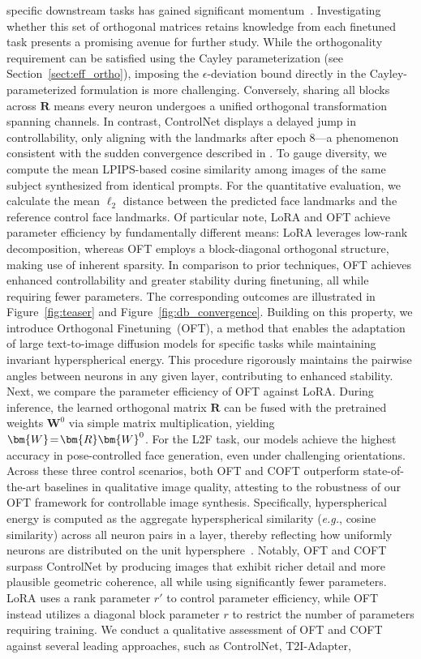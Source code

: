 {\begin{itemize}[leftmargin=*,nosep]
specific downstream tasks has gained significant momentum~\cite{devlin2018bert,brown2020language,he2022masked}. Investigating whether this set of orthogonal matrices retains knowledge from each finetuned task presents a promising avenue for further study. While the orthogonality requirement can be satisfied using the Cayley parameterization (see Section~\ref{sect:eff_ortho}), imposing the $\epsilon$-deviation bound directly in the Cayley-parameterized formulation is more challenging. Conversely, sharing all blocks across $\bm{R}$ means every neuron undergoes a unified orthogonal transformation spanning channels. In contrast, ControlNet displays a delayed jump in controllability, only aligning with the landmarks after epoch 8—a phenomenon consistent with the sudden convergence described in \cite{zhang2023adding}. To gauge diversity, we compute the mean LPIPS-based cosine similarity among images of the same subject synthesized from identical prompts. For the quantitative evaluation, we calculate the mean $\ell_2$ distance between the predicted face landmarks and the reference control face landmarks. Of particular note, LoRA and OFT achieve parameter efficiency by fundamentally different means: LoRA leverages low-rank decomposition, whereas OFT employs a block-diagonal orthogonal structure, making use of inherent sparsity. In comparison to prior techniques, OFT achieves enhanced controllability and greater stability during finetuning, all while requiring fewer parameters. The corresponding outcomes are illustrated in Figure~\ref{fig:teaser} and Figure~\ref{fig:db_convergence}. Building on this property, we introduce Orthogonal Finetuning~(OFT), a method that enables the adaptation of large text-to-image diffusion models for specific tasks while maintaining invariant hyperspherical energy. This procedure rigorously maintains the pairwise angles between neurons in any given layer, contributing to enhanced stability. Next, we compare the parameter efficiency of OFT against LoRA. During inference, the learned orthogonal matrix $\bm{R}$ can be fused with the pretrained weights $\bm{W}^0$ via simple matrix multiplication, yielding $\thickmuskip=2mu \medmuskip=2mu \bm{W}=\bm{R}\bm{W}^0$. For the L2F task, our models achieve the highest accuracy in pose-controlled face generation, even under challenging orientations. Across these three control scenarios, both OFT and COFT outperform state-of-the-art baselines in qualitative image quality, attesting to the robustness of our OFT framework for controllable image synthesis. Specifically, hyperspherical energy is computed as the aggregate hyperspherical similarity (\emph{e.g.}, cosine similarity) across all neuron pairs in a layer, thereby reflecting how uniformly neurons are distributed on the unit hypersphere~\cite{liu2021learning}. Notably, OFT and COFT surpass ControlNet by producing images that exhibit richer detail and more plausible geometric coherence, all while using significantly fewer parameters. LoRA uses a rank parameter $r'$ to control parameter efficiency, while OFT instead utilizes a diagonal block parameter $r$ to restrict the number of parameters requiring training. We conduct a qualitative assessment of OFT and COFT against several leading approaches, such as ControlNet, T2I-Adapter, 
\end{itemize}}
